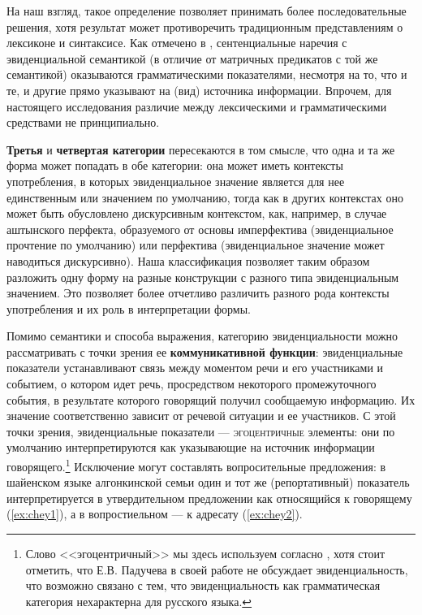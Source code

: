 На наш взгляд, такое определение позволяет принимать более последовательные решения, хотя результат может противоречить традиционным представлениям о лексиконе и синтаксисе. Как отмечено в \citep[3]{cornillie2015}, сентенциальные наречия с эвиденциальной семантикой (в отличие от матричных предикатов с той же семантикой) оказываются грамматическими показателями, несмотря на то, что и те, и другие прямо указывают на (вид) источника информации. Впрочем, для настоящего исследования различие между лексическими и грамматическими средствами не принципиально.
\par \textbf{Третья} и \textbf{четвертая категории} пересекаются в том смысле, что одна и та же форма может попадать в обе категории: она может иметь контексты употребления, в которых эвиденциальное значение является для нее единственным или значением по умолчанию, тогда как в других контекстах оно может быть обусловлено дискурсивным контекстом, как, например, в случае аштынского перфекта, образуемого от основы имперфектива (эвиденциальное прочтение по умолчанию) или перфектива (эвиденциальное значение может наводиться дискурсивно). 
Наша классификация позволяет таким образом разложить одну форму на разные конструкции с разного типа эвиденциальным значением. Это позволяет более отчетливо различить разного рода контексты употребления и их роль в интерпретации формы.
\par Помимо семантики и способа выражения, категорию эвиденциальности можно рассматривать с точки зрения ее \textbf{коммуникативной функции}: эвиденциальные показатели устанавливают связь между моментом речи и его участниками и событием, о котором идет речь, просредством некоторого промежуточного события, в результате которого говорящий получил сообщаемую информацию. Их значение соответственно зависит от речевой ситуации и ее участников. 
С этой точки зрения, эвиденциальные показатели --- \textsc{эгоцентричные} элементы: они по умолчанию интерпретируются как указывающие на источник информации говорящего.\footnote{Слово <<эгоцентричный>> мы здесь используем согласно \citep[258--284]{paducheva2010}, хотя стоит отметить, что Е.В. Падучева в своей работе не обсуждает эвиденциальность, что возможно связано с тем, что эвиденциальность как грамматическая категория нехарактерна для русского языка.} Исключение могут составлять вопросительные предложения: в шайенском языке алгонкинской семьи один и тот же (репортативный) показатель интерпретируется в утвердительном предложении как относящийся к говорящему (\ref{ex:chey1}), а в вопростиельном --- к адресату (\ref{ex:chey2}).

